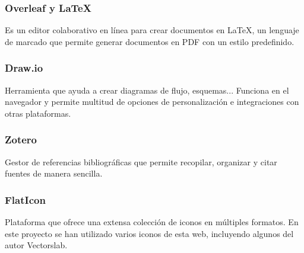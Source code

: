 \subsubsection{Overleaf y LaTeX}
\label{subsubsec:overleaf}
Es un editor colaborativo en línea para crear documentos en LaTeX, un lenguaje de marcado que permite generar documentos en PDF con un estilo predefinido.

\subsubsection{Draw.io}
\label{subsubsec:draw}
Herramienta que ayuda a crear diagramas de flujo, esquemas... Funciona en el navegador y permite multitud de opciones de personalización e integraciones con otras plataformas.

\subsubsection{Zotero}
\label{subsubsec:zotero}
Gestor de referencias bibliográficas que permite recopilar, organizar y citar fuentes de manera sencilla.

\subsubsection{FlatIcon}
\label{subsubsec:flaticon}
Plataforma que ofrece una extensa colección de iconos en múltiples formatos. En este proyecto se han utilizado varios iconos de esta web, incluyendo algunos del autor Vectorslab.
 
